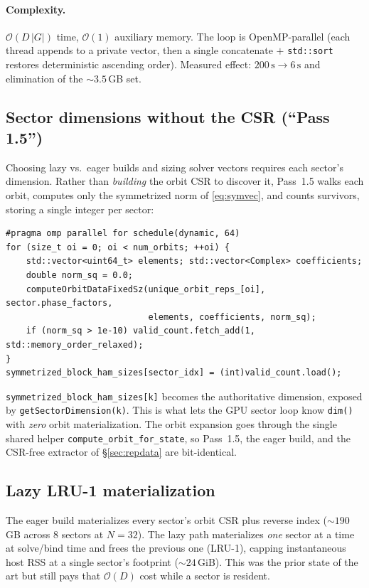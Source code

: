 \documentclass[11pt]{article}
\newcommand{\bigO}{\mathcal{O}}
\newcommand{\code}[1]{\texttt{\small #1}}
\begin{document}
\paragraph{Complexity.} $\bigO(D\,|G|)$ time, $\bigO(1)$ auxiliary memory. The
loop is OpenMP-parallel (each thread appends to a private vector, then a single
concatenate $+$ \code{std::sort} restores deterministic ascending order).
Measured effect: $200\,\text{s}\rightarrow 6\,\text{s}$ and elimination of the
${\sim}3.5$\,GB set.

\subsection{Sector dimensions without the CSR (``Pass 1.5'')}

Choosing lazy vs.\ eager builds and sizing solver vectors requires each sector's
dimension. Rather than \emph{building} the orbit CSR to discover it, Pass~1.5
walks each orbit, computes only the symmetrized norm of \eqref{eq:symvec}, and
counts survivors, storing a single integer per sector:

\begin{lstlisting}[caption={Norm-only dimension scan; thread-local scratch is
discarded. \code{streaming\_symmetry.h}}]
#pragma omp parallel for schedule(dynamic, 64)
for (size_t oi = 0; oi < num_orbits; ++oi) {
    std::vector<uint64_t> elements; std::vector<Complex> coefficients;
    double norm_sq = 0.0;
    computeOrbitDataFixedSz(unique_orbit_reps_[oi], sector.phase_factors,
                            elements, coefficients, norm_sq);
    if (norm_sq > 1e-10) valid_count.fetch_add(1, std::memory_order_relaxed);
}
symmetrized_block_ham_sizes[sector_idx] = (int)valid_count.load();
\end{lstlisting}

\code{symmetrized\_block\_ham\_sizes[k]} becomes the authoritative dimension,
exposed by \code{getSectorDimension(k)}. This is what lets the GPU sector loop
know \code{dim()} with \emph{zero} orbit materialization. The orbit expansion
goes through the single shared helper \code{compute\_orbit\_for\_state}, so
Pass~1.5, the eager build, and the CSR-free extractor of
\S\ref{sec:repdata} are bit-identical.

\subsection{Lazy LRU-1 materialization}

The eager build materializes every sector's orbit CSR plus reverse index
(${\sim}190$\,GB across $8$ sectors at $N{=}32$). The lazy path materializes
\emph{one} sector at a time at solve/bind time and frees the previous one
(LRU-1), capping instantaneous host RSS at a single sector's footprint
(${\sim}24$\,GiB). This was the prior state of the art but still pays that
$\bigO(D)$ cost while a sector is resident.
\end{document}
